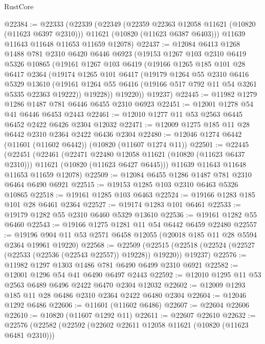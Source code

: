 \begin{lexlean}{RustCore}
\begin{coremodule}
@22384 := @22333
    (@22339
      (@22349
        (@22359 @22363 @12058 @11621 (@10820 (@11623 @6397 @2310)))
        @11621
        (@10820 (@11623 @6387 @6403)))
      @11639
      @11643
      @11648
      @11653
      @11659
      @12078)
@22437 := @12084
    @6413
    @1268
    @1488
    @781
    @2310
    @6420
    @6446
    @6923
    (@19153
      @1267
      @103
      @2310
      @6419
      @5326
      @10865
      (@19161
        @1267
        @103
        @6419
        (@19166
          @1265
          @185
          @101
          @28
          @6417
          @2364
          (@19174
            @1265
            @101
            @6417
            (@19179
              @1264
              @55
              @2310
              @6416
              @5329
              @13610
              (@19161 @1264 @55 @6416 (@19166 @517 @792 @11 @54 @3261 @5335 @22363 @19222))
              @19228))
          @19220))
      @19237)
@22445 := @11982 @1279 @1286 @1487 @781 @6446 @6455 @2310 @6923
@22451 := @12001 @1278 @54 @41 @6446 @6453 @2443
@22461 := @12010 @1277 @11 @53 @2563 @6445 @6452 @2422 @6426 @2304 @12032
@22471 := @12009 @1275 @185 @11 @28 @6442 @2310 @2364 @2422 @6436 @2304
@22480 := @12046 @1274 @6442 (@11601 (@11602 @6442)) (@10820 (@11607 @1274 @11))
@22501 := @22445
    (@22451
      (@22461
        (@22471 @22480 @12058 @11621 (@10820 (@11623 @6437 @2310)))
        @11621
        (@10820 (@11623 @6427 @6445)))
      @11639
      @11643
      @11648
      @11653
      @11659
      @12078)
@22509 := @12084 @6455 @1286 @1487 @781 @2310 @6464 @6490 @6921
@22515 := @19153 @1285 @103 @2310 @6463 @5326 @10865
@22518 := @19161 @1285 @103 @6463
@22524 := @19166 @1283 @185 @101 @28 @6461 @2364
@22527 := @19174 @1283 @101 @6461
@22533 := @19179 @1282 @55 @2310 @6460 @5329 @13610
@22536 := @19161 @1282 @55 @6460
@22543 := @19166 @1275 @1281 @11 @54 @6442 @6459 @22480
@22557 := @19196 @904 @11 @53 @2571 @6458 @12055 (@20018 @185 @11 @28 @5594 @2364 @19961 @19220)
@22568 := @22509
    (@22515 (@22518 (@22524 (@22527 (@22533 (@22536 (@22543 @22557)) @19228)) @19220)) @19237)
@22576 := @11982 @1297 @1303 @1486 @781 @6490 @6499 @2310 @6921
@22582 := @12001 @1296 @54 @41 @6490 @6497 @2443
@22592 := @12010 @1295 @11 @53 @2563 @6489 @6496 @2422 @6470 @2304 @12032
@22602 := @12009 @1293 @185 @11 @28 @6486 @2310 @2364 @2422 @6480 @2304
@22604 := @12046 @1292 @6486
@22606 := @11601 (@11602 @6486)
@22607 := @22604 @22606
@22610 := @10820 (@11607 @1292 @11)
@22611 := @22607 @22610
@22632 := @22576
    (@22582
      (@22592
        (@22602 @22611 @12058 @11621 (@10820 (@11623 @6481 @2310)))

\end{coremodule}
\end{lexlean}
